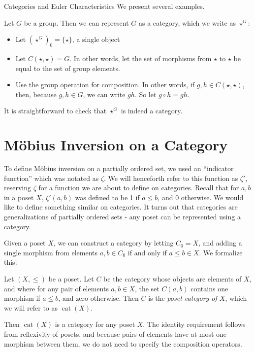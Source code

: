 \documentclass[12pt]{pom_thesis}
\DeclareMathOperator{\cat}{cat}
\begin{document}
\begin{chapter}{Categories and Euler Characteristics}
We present several examples.
\begin{examp}\label{ex:grp_cat}
Let $G$ be a group. Then we can represent $G$ as a category, which we write as $\star^G$:
\begin{itemize}
\item Let $(\star^G)_0 = \{\star\}$, a single object
\item Let $C(\star, \star) = G$. In other words, let the set of morphisms from $\star$ to $\star$ be equal to the set of group elements.
\item Use the group operation for composition. In other words, if $g,h \in C(\star,\star)$, then, because $g,h \in G$, we can write $gh$. So let $g \circ h = gh$. 
\end{itemize}
It is straightforward to check that $\star^G$ is indeed a category. 
\end{examp}



\section{M\"obius Inversion on a Category}
To define M\"obius inversion on a partially ordered set, we used an ``indicator function'' which was notated as $\zeta$. We will henceforth refer to this function as $\zeta'$, reserving $\zeta$ for a function we are about to define on categories. Recall that for $a,b$ in a poset $X$, $\zeta'(a,b)$ was defined to be 1 if $a \leq b$, and 0 otherwise. We would like to define something similar on categories. It turns out that categories are generalizations of partially ordered sets - any poset can be represented using a category.

Given a poset $X$, we can construct a category by letting $C_0=X$, and adding a single morphism from elements $a,b \in C_0$ if and only if $a \leq b \in X$. We formalize this:

\begin{defn}\label{cat_poset}
Let $(X, \leq)$ be a poset. Let $C$ be the category whose objects are elements of $X$, and where for any pair of elements $a,b \in X$, the set $C(a,b)$ contains one morphism if $a \leq b$, and zero otherwise. Then $C$ is the \emph{poset category of $X$}, which we will refer to as $\cat(X)$.
\end{defn}
Then $\cat(X)$ is a category for any poset $X$. The identity requirement follows from reflexivity of posets, and because pairs of elements have at most one morphism between them, we do not need to specify the composition operators.


\end{chapter}
\end{document}
